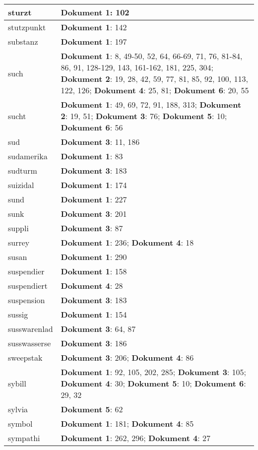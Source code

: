 \documentclass[a5paper]{article}
\begin{document}
\begin{longtable}[l]{|l|p{3in}|}
\hline
sturzt & \textbf{Dokument 1}: 102 \\
\hline
stutzpunkt & \textbf{Dokument 1}: 142 \\
\hline
substanz & \textbf{Dokument 1}: 197 \\
\hline
such & \textbf{Dokument 1}: 8, 49-50, 52, 64, 66-69, 71, 76, 81-84, 86, 91, 128-129, 143, 161-162, 181, 225, 304; \textbf{Dokument 2}: 19, 28, 42, 59, 77, 81, 85, 92, 100, 113, 122, 126; \textbf{Dokument 4}: 25, 81; \textbf{Dokument 6}: 20, 55 \\
\hline
sucht & \textbf{Dokument 1}: 49, 69, 72, 91, 188, 313; \textbf{Dokument 2}: 19, 51; \textbf{Dokument 3}: 76; \textbf{Dokument 5}: 10; \textbf{Dokument 6}: 56 \\
\hline
sud & \textbf{Dokument 3}: 11, 186 \\
\hline
sudamerika & \textbf{Dokument 1}: 83 \\
\hline
sudturm & \textbf{Dokument 3}: 183 \\
\hline
suizidal & \textbf{Dokument 1}: 174 \\
\hline
sund & \textbf{Dokument 1}: 227 \\
\hline
sunk & \textbf{Dokument 3}: 201 \\
\hline
suppli & \textbf{Dokument 3}: 87 \\
\hline
surrey & \textbf{Dokument 1}: 236; \textbf{Dokument 4}: 18 \\
\hline
susan & \textbf{Dokument 1}: 290 \\
\hline
suspendier & \textbf{Dokument 1}: 158 \\
\hline
suspendiert & \textbf{Dokument 4}: 28 \\
\hline
suspension & \textbf{Dokument 3}: 183 \\
\hline
sussig & \textbf{Dokument 1}: 154 \\
\hline
susswarenlad & \textbf{Dokument 3}: 64, 87 \\
\hline
susswasserse & \textbf{Dokument 3}: 186 \\
\hline
sweepstak & \textbf{Dokument 3}: 206; \textbf{Dokument 4}: 86 \\
\hline
sybill & \textbf{Dokument 1}: 92, 105, 202, 285; \textbf{Dokument 3}: 105; \textbf{Dokument 4}: 30; \textbf{Dokument 5}: 10; \textbf{Dokument 6}: 29, 32 \\
\hline
sylvia & \textbf{Dokument 5}: 62 \\
\hline
symbol & \textbf{Dokument 1}: 181; \textbf{Dokument 4}: 85 \\
\hline
sympathi & \textbf{Dokument 1}: 262, 296; \textbf{Dokument 4}: 27 \\

\end{longtable}
\end{document}
